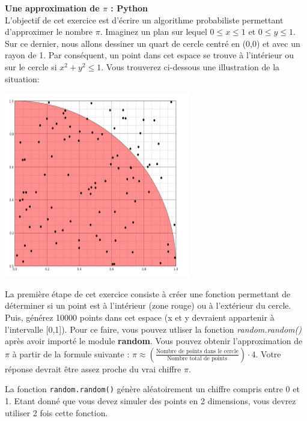 \begin{Exercice}[15 minutes]\textbf{Une approximation de $\pi$ : Python}\\
    L'objectif de cet exercice est d'écrire un algorithme probabiliste permettant d'approximer le nombre $\pi$. Imaginez un plan sur lequel $0 \leq x \leq 1$ et $0 \leq y \leq 1$. Sur ce dernier, nous allons dessiner un quart de cercle centré en (0,0) et avec un rayon de 1. Par conséquent, un point dans cet espace se trouve à l'intérieur ou sur le cercle si $x^2 + y^2 \leq 1$. Vous trouverez ci-dessous une illustration de la situation:
    \begin{center}
    \includegraphics[]{resources/Cercle.PNG}
    \end{center}
    La première étape de cet exercice consiste à créer une fonction permettant de déterminer si un point est à l'intérieur (zone rouge) ou à l'extérieur du cercle. Puis, générez 10000 points dans cet espace (x et y devraient appartenir à l'intervalle [0,1]). Pour ce faire, vous pouvez utliser la fonction \textit{random.random()} après avoir importé le module \textbf{random}. Vous pouvez obtenir l'approximation de $\pi$ à partir de la formule suivante : $\pi \approx (\frac{\text{Nombre de points dans le cercle}}{\text{Nombre total de points}})\cdot 4$. Votre réponse devrait être assez proche du vrai chiffre $\pi$.\\
    \begin{conseil}
        La fonction \lstinline{random.random()} génère aléatoirement un chiffre compris entre 0 et 1. Etant donné que vous devez simuler des points en 2 dimensions, vous devrez utiliser 2 fois cette fonction.
    \end{conseil}
    \begin{solution}
        
    \end{solution}
    
\end{Exercice}
\newpage
